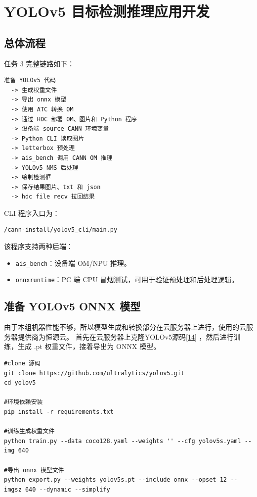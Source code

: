 
\chapter{YOLOv5 目标检测推理应用开发}

\section{总体流程}

任务 3 完整链路如下：

\begin{lstlisting}[caption={总体流程}]
准备 YOLOv5 代码
  -> 生成权重文件
  -> 导出 onnx 模型
  -> 使用 ATC 转换 OM
  -> 通过 HDC 部署 OM、图片和 Python 程序
  -> 设备端 source CANN 环境变量
  -> Python CLI 读取图片
  -> letterbox 预处理
  -> ais_bench 调用 CANN OM 推理
  -> YOLOv5 NMS 后处理
  -> 绘制检测框
  -> 保存结果图片、txt 和 json
  -> hdc file recv 拉回结果
\end{lstlisting}

CLI 程序入口为：

\begin{lstlisting}[caption={CLI 入口}]
/cann-install/yolov5_cli/main.py
\end{lstlisting}

该程序支持两种后端：

\begin{itemize}
  \item \texttt{ais\_bench}：设备端 OM/NPU 推理。
  \item \texttt{onnxruntime}：PC 端 CPU 冒烟测试，可用于验证预处理和后处理逻辑。
\end{itemize}


\section{准备 YOLOv5 ONNX 模型}

由于本组机器性能不够，所以模型生成和转换部分在云服务器上进行，使用的云服务器提供商为恒源云。
首先在云服务器上克隆YOLOv5源码\hyperref[ref:yolov5]{[14]} ，然后进行训练，生成 .pt 权重文件，接着导出为 ONNX 模型。

\begin{lstlisting}[style=shell, caption={导出 ONNX}]
#clone 源码
git clone https://github.com/ultralytics/yolov5.git
cd yolov5

#环境依赖安装
pip install -r requirements.txt

#训练生成权重文件
python train.py --data coco128.yaml --weights '' --cfg yolov5s.yaml --img 640

#导出 onnx 模型文件
python export.py --weights yolov5s.pt --include onnx --opset 12 --imgsz 640 --dynamic --simplify
\end{lstlisting}

